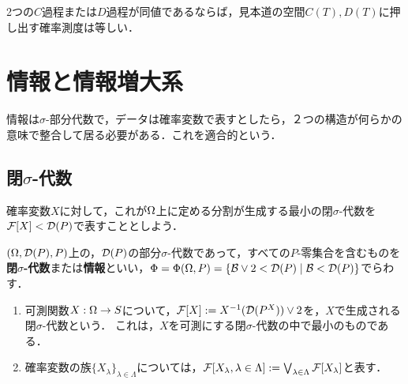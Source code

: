 \documentclass[uplatex,dvipdfmx]{jsreport}
\begin{document}
\begin{theorem}
    2つの$C$過程または$D$過程が同値であるならば，見本道の空間$C(T),D(T)$に押し出す確率測度は等しい．
\end{theorem}

\section{情報と情報増大系}

\begin{tcolorbox}[colframe=ForestGreen, colback=ForestGreen!10!white,breakable,colbacktitle=ForestGreen!40!white,coltitle=black,fonttitle=\bfseries\sffamily,
title=]
    情報は$\sigma$-部分代数で，データは確率変数で表すとしたら，２つの構造が何らかの意味で整合して居る必要がある．これを適合的という．
\end{tcolorbox}

\subsection{閉$\sigma$-代数}

\begin{tcolorbox}[colframe=ForestGreen, colback=ForestGreen!10!white,breakable,colbacktitle=ForestGreen!40!white,coltitle=black,fonttitle=\bfseries\sffamily,
title=]
    確率変数$X$に対して，これが$\Omega$上に定める分割が生成する最小の閉$\sigma$-代数を$\mathcal{F}[X]<\mathcal{D}(P)$で表すこととしよう．
\end{tcolorbox}

\begin{notation}
    $(\Omega,\mathcal{D}(P),P)$上の，$\mathcal{D}(P)$の部分$\sigma$-代数であって，すべての$P$-零集合を含むものを\textbf{閉$\sigma$-代数}または\textbf{情報}といい，$\Phi=\Phi(\Omega,P)=\left\{\mathcal{B}\lor2<\mathcal{D}(P)\mid\mathcal{B}<\mathcal{D}(P)\right\}$でらわす．
\end{notation}

\begin{definition}\mbox{}
    \begin{enumerate}
        \item 可測関数$X:\Omega\to S$について，$\mathcal{F}[X]:=X^{-1}(\mathcal{D}(P^X))\lor 2$を，$X$で生成される閉$\sigma$-代数という．
        これは，$X$を可測にする閉$\sigma$-代数の中で最小のものである．
        \item 確率変数の族$\{X_\lambda\}_{\lambda\in\Lambda}$については，$\mathcal{F}[X_\lambda,\lambda\in\Lambda]:=\bigvee_{\lambda\in\Lambda}\mathcal{F}[X_\lambda]$と表す．
    \end{enumerate}
\end{definition}
\end{document}
